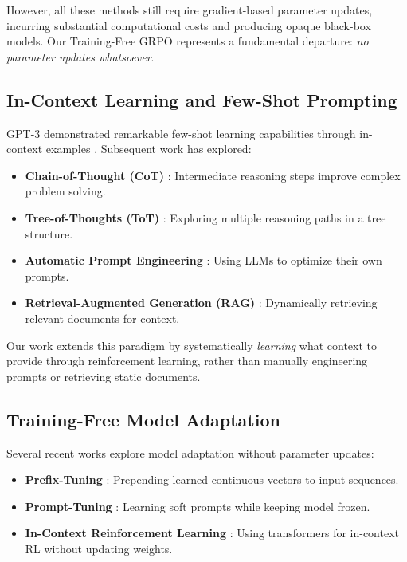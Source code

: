 \documentclass[11pt,a4paper]{article}
\begin{document}
However, all these methods still require gradient-based parameter updates, incurring substantial computational costs and producing opaque black-box models. Our Training-Free GRPO represents a fundamental departure: \textit{no parameter updates whatsoever}.

\subsection{In-Context Learning and Few-Shot Prompting}

GPT-3 demonstrated remarkable few-shot learning capabilities through in-context examples \cite{brown2020language}. Subsequent work has explored:
\begin{itemize}
    \item \textbf{Chain-of-Thought (CoT)} \cite{wei2022chain}: Intermediate reasoning steps improve complex problem solving.
    \item \textbf{Tree-of-Thoughts (ToT)} \cite{yao2023tree}: Exploring multiple reasoning paths in a tree structure.
    \item \textbf{Automatic Prompt Engineering} \cite{zhou2022large}: Using LLMs to optimize their own prompts.
    \item \textbf{Retrieval-Augmented Generation (RAG)} \cite{lewis2020retrieval}: Dynamically retrieving relevant documents for context.
\end{itemize}

Our work extends this paradigm by systematically \textit{learning} what context to provide through reinforcement learning, rather than manually engineering prompts or retrieving static documents.

\subsection{Training-Free Model Adaptation}

Several recent works explore model adaptation without parameter updates:
\begin{itemize}
    \item \textbf{Prefix-Tuning} \cite{li2021prefix}: Prepending learned continuous vectors to input sequences.
    \item \textbf{Prompt-Tuning} \cite{lester2021power}: Learning soft prompts while keeping model frozen.
    \item \textbf{In-Context Reinforcement Learning} \cite{laskin2022context}: Using transformers for in-context RL without updating weights.
\end{itemize}
\end{document}
